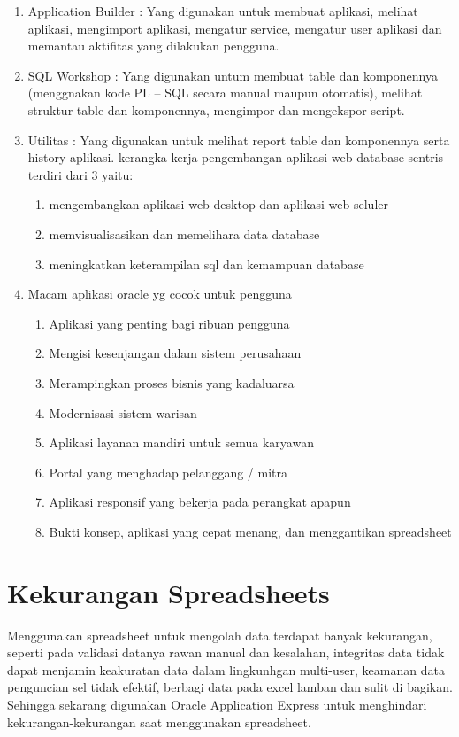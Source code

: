 \begin{enumerate}
    \item Application Builder : Yang digunakan untuk membuat aplikasi, melihat
aplikasi, mengimport aplikasi, mengatur service, mengatur user aplikasi dan
memantau aktifitas yang dilakukan pengguna.
    \item SQL Workshop : Yang digunakan untum membuat table dan komponennya (menggnakan kode PL – SQL secara manual maupun otomatis), melihat
struktur table dan komponennya, mengimpor dan mengekspor script.
    \item Utilitas : Yang digunakan untuk melihat report table dan komponennya serta history aplikasi. kerangka kerja pengembangan aplikasi web database sentris terdiri dari 3 yaitu:
    \begin{enumerate}
        \item mengembangkan aplikasi web desktop dan aplikasi web seluler
        \item memvisualisasikan dan memelihara data database
        \item meningkatkan keterampilan sql dan kemampuan database
    \end{enumerate}
    \item Macam aplikasi oracle yg cocok untuk pengguna
    \begin{enumerate}
        \item Aplikasi yang penting bagi ribuan pengguna
        \item Mengisi kesenjangan dalam sistem perusahaan
        \item Merampingkan proses bisnis yang kadaluarsa
        \item Modernisasi sistem warisan
        \item Aplikasi layanan mandiri untuk semua karyawan
        \item Portal yang menghadap pelanggang / mitra
        \item Aplikasi responsif yang bekerja pada perangkat apapun 
        \item Bukti konsep, aplikasi yang cepat menang, dan menggantikan spreadsheet
    \end{enumerate}
\end{enumerate}
\section{Kekurangan Spreadsheets}
   Menggunakan spreadsheet untuk mengolah data terdapat banyak kekurangan, seperti pada validasi datanya rawan manual dan kesalahan, integritas data tidak dapat menjamin keakuratan data dalam lingkunhgan multi-user, keamanan data penguncian sel tidak efektif, berbagi data pada excel lamban dan sulit di bagikan. Sehingga sekarang digunakan Oracle Application Express untuk menghindari kekurangan-kekurangan saat menggunakan spreadsheet.
